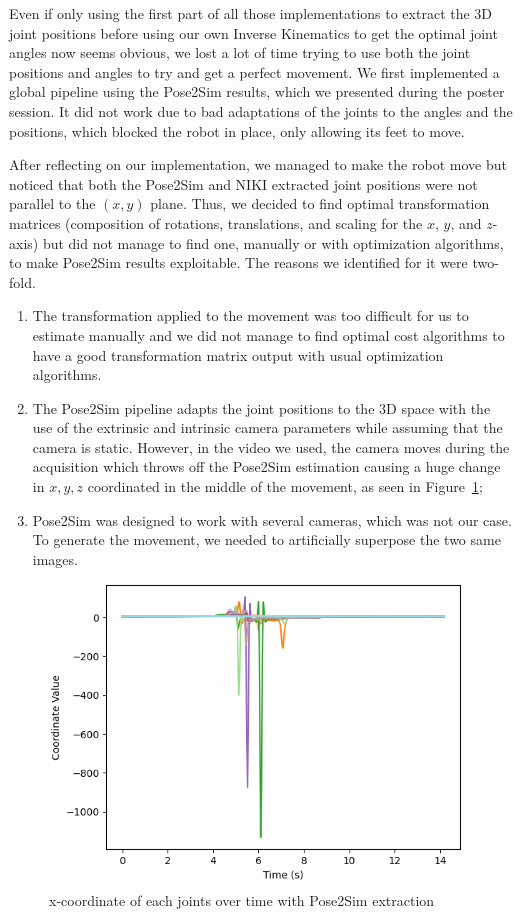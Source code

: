\documentclass{amsart}
\theoremstyle{definition}
\theoremstyle{plain}
\begin{document}
Even if only using the first part of all those implementations to extract the 3D joint positions before using our own Inverse Kinematics to get the optimal joint angles now seems obvious, 
we lost a lot of time trying to use both the joint positions and angles to try and get a perfect movement. 
We first implemented a global pipeline using the Pose2Sim results, which we presented during the poster session. 
It did not work due to bad adaptations of the joints to the angles and the positions, which blocked the robot in place, only allowing its feet to move. 

After reflecting on our implementation, we managed to make the robot move but noticed that both the Pose2Sim and NIKI extracted joint positions were not parallel to the $(x, y)$ plane. 
Thus, we decided to find optimal transformation matrices (composition of rotations, translations, and scaling for the $x$, $y$, and $z$-axis) but did not manage to find one, manually or with optimization algorithms, to make Pose2Sim results exploitable. 
The reasons we identified for it were two-fold.
\begin{enumerate}
    \item The transformation applied to the movement was too difficult for us to estimate manually and we did not manage to find optimal cost algorithms to have a good transformation matrix output with usual optimization algorithms.
    \item The Pose2Sim pipeline adapts the joint positions to the 3D space with the use of the extrinsic and intrinsic camera parameters while assuming that the camera is static. 
    However, in the video we used, the camera moves during the acquisition which throws off the Pose2Sim estimation causing a huge change in $x,y,z$ coordinated in the middle of the movement, as seen in Figure~\ref{fig:x_coord_pose2sim};
    \item Pose2Sim was designed to work with several cameras, which was not our case. To generate the movement, we needed to artificially superpose the two same images.
\end{enumerate}
\begin{figure}
  \includegraphics[width = 0.33 \columnwidth]{img/x_coord_pose2sim.png}
  \caption{x-coordinate of each joints over time with Pose2Sim extraction}\label{fig:x_coord_pose2sim}
\end{figure}
\end{document}
